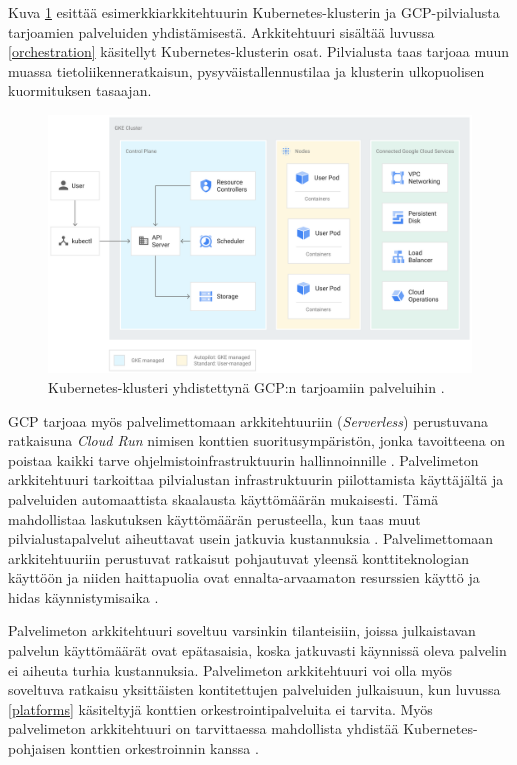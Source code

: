 Kuva \ref{fig:architecture} esittää esimerkkiarkkitehtuurin Kubernetes-klusterin ja GCP-pilvialusta tarjoamien palveluiden yhdistämisestä.
Arkkitehtuuri sisältää luvussa \ref{orchestration} käsitellyt Kubernetes-klusterin osat.
Pilvialusta taas tarjoaa muun muassa tietoliikenneratkaisun, pysyväistallennustilaa ja klusterin ulkopuolisen kuormituksen tasaajan.


\begin{figure}[ht]
\begin{center}
\includegraphics[width=1\textwidth]{figures/gke_architecture.png}
\caption{Kubernetes-klusteri yhdistettynä GCP:n tarjoamiin palveluihin \cite{cluster23}\label{fig:architecture}.}
\end{center}
\end{figure}

GCP tarjoaa myös palvelimettomaan arkkitehtuuriin (\textit{Serverless}) perustuvana ratkaisuna \textit{Cloud Run} nimisen konttien suoritusympäristön, jonka tavoitteena on poistaa kaikki tarve ohjelmistoinfrastruktuurin hallinnoinnille \cite{Products23}.
Palvelimeton arkkitehtuuri tarkoittaa pilvialustan infrastruktuurin piilottamista käyttäjältä ja palveluiden automaattista skaalausta käyttömäärän mukaisesti.
Tämä mahdollistaa laskutuksen käyttömäärän perusteella, kun taas muut pilvialustapalvelut aiheuttavat usein jatkuvia kustannuksia \cite{shafiei22}.
Palvelimettomaan arkkitehtuuriin perustuvat ratkaisut pohjautuvat yleensä konttiteknologian käyttöön ja niiden haittapuolia ovat ennalta-arvaamaton resurssien käyttö ja hidas käynnistymisaika \cite{shafiei22, mondal22}.

Palvelimeton arkkitehtuuri soveltuu varsinkin tilanteisiin, joissa julkaistavan palvelun käyttömäärät ovat epätasaisia, koska jatkuvasti käynnissä oleva palvelin ei aiheuta turhia kustannuksia.
Palvelimeton arkkitehtuuri voi olla myös soveltuva ratkaisu yksittäisten kontitettujen palveluiden julkaisuun, kun luvussa \ref{platforms} käsiteltyjä konttien orkestrointipalveluita ei tarvita.
Myös palvelimeton arkkitehtuuri on tarvittaessa mahdollista yhdistää Kubernetes-pohjaisen konttien orkestroinnin kanssa \cite{mondal22}.

